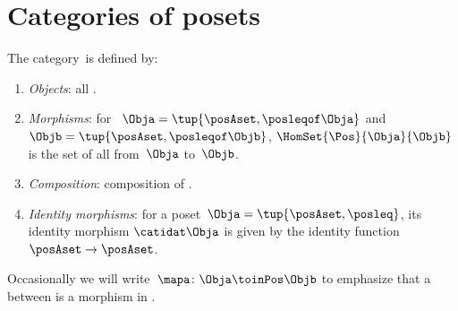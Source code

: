 
\section[Categories of posets]{Categories of posets}
\label{sec:category-Pos}

\begin{ctdefinition}
    \label{def:Pos}
    The category~\Pos is defined by:
    \begin{enumerate}
        \item \emph{Objects}: all .
        \item \emph{Morphisms}: for ~$\Obja = \tup{\posAset, {{\posleqof\Obja}}}$ and $\Objb = \tup{\posAset, {{\posleqof\Objb}}}$,  $\HomSet{\Pos}{\Obja}{\Objb}$ is the set of all  from~$\Obja$ to~$\Objb$.
        \item \emph{Composition}: composition of .
        \item \emph{Identity morphisms}: for a poset~$\Obja = \tup{\posAset, {{\posleq}}}$, its identity morphism $\catidat\Obja$ is given by the identity function $\posAset \to \posAset$.
    \end{enumerate}
\end{ctdefinition}

Occasionally we will write~$\mapa \colon \Obja \toinPos \Objb$ to emphasize that a  between  is a morphism in \Pos.
